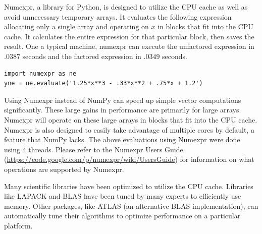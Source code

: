 Numexpr, a library for Python, is designed to utilize the CPU cache as well as avoid unnecessary temporary arrays.
It evaluates the following expression allocating only a single array and operating on $x$ in blocks that fit into the CPU cache.
It calculates the entire expression for that particular block, then saves the result.
One a typical machine, numexpr can execute the unfactored expression in $.0387$ seconds and the factored expression in $.0349$ seconds.
\begin{lstlisting}
import numexpr as ne
yne = ne.evaluate('1.25*x**3 - .33*x**2 + .75*x + 1.2')
\end{lstlisting}
Using Numexpr instead of NumPy can speed up simple vector computations significantly.
These large gains in performance are primarily for large arrays.
Numexpr will operate on these large arrays in blocks that fit into the CPU cache.
Numexpr is also designed to easily take advantage of multiple cores by default, a feature that NumPy lacks.
The above evaluations using Numexpr were done using 4 threads.
Please refer to the Numexpr Users Guide (\url{https://code.google.com/p/numexpr/wiki/UsersGuide}) for information on what operations are supported by Numexpr.

Many scientific libraries have been optimized to utilize the CPU cache.
Libraries like LAPACK and BLAS have been tuned by many experts to efficiently use memory.
Other packages, like ATLAS (an alternative BLAS implementation), can automatically tune their algorithms to optimize performance on a particular platform.

